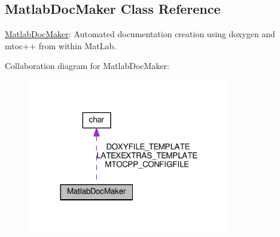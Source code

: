 \hypertarget{class_matlab_doc_maker}{}\subsection{Matlab\+Doc\+Maker Class Reference}
\label{class_matlab_doc_maker}


\hyperlink{class_matlab_doc_maker}{Matlab\+Doc\+Maker}\+: Automated documentation creation using doxygen and mtoc++ from within Mat\+Lab.  




Collaboration diagram for Matlab\+Doc\+Maker\+:
\nopagebreak
\begin{figure}[H]
\begin{center}
\leavevmode
\includegraphics[width=252pt]{class_matlab_doc_maker__coll__graph}
\end{center}
\end{figure}
